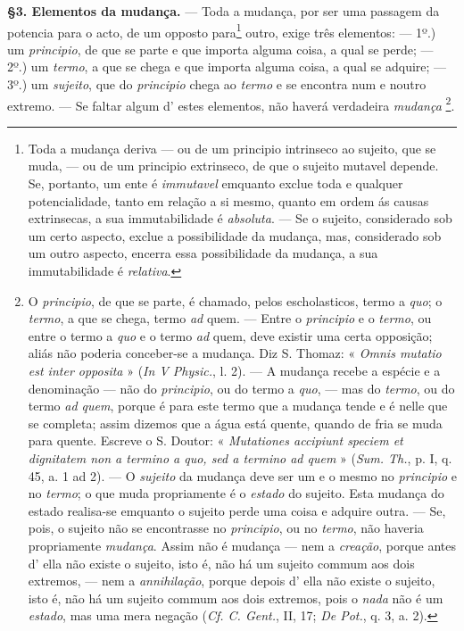 \textbf{§3. Elementos da mudança.} --- Toda a mudança, por ser uma passagem da potencia para o acto, de um opposto para\footnote{Toda a mudança deriva --- ou de um principio intrinseco ao sujeito, que se muda, --- ou de um principio extrinseco, de que o sujeito mutavel depende. Se, portanto, um ente é \emph{immutavel} emquanto exclue toda e qualquer potencialidade, tanto em relação a si mesmo, quanto em ordem ás causas extrinsecas, a sua immutabilidade é \emph{absoluta}. --- Se o sujeito, considerado sob um certo aspecto, exclue a possibilidade da mudança, mas, considerado sob um outro aspecto, encerra essa possibilidade da mudança, a sua immutabilidade é \emph{relativa}.} outro, exige três elementos: --- 1º.) um \emph{principio}, de que se parte e que importa alguma coisa, a qual se perde; --- 2º.) um \emph{termo}, a que se chega e que importa alguma coisa, a qual se adquire; --- 3º.) um \emph{sujeito}, que do \emph{principio} chega ao \emph{termo} e se encontra num e noutro extremo. --- Se faltar algum d' estes elementos, não haverá verdadeira \emph{mudança} \footnote{O \emph{principio}, de que se parte, é chamado, pelos escholasticos, termo a \emph{quo}; o \emph{termo}, a que se chega, termo \emph{ad} quem. --- Entre o \emph{principio} e o \emph{termo}, ou entre o termo a \emph{quo} e o termo \emph{ad} quem, deve existir uma certa opposição; aliás não poderia conceber-se a mudança. Diz S. Thomaz: « \emph{Omnis mutatio est inter opposita} » (\emph{In V Physic.}, l. 2). --- A mudança recebe a espécie e a denominação --- não do \emph{principio}, ou do termo a \emph{quo}, --- mas do \emph{termo}, ou do termo \emph{ad quem}, porque é para este termo que a mudança tende e é nelle que se completa; assim dizemos que a água está quente, quando de fria se muda para quente. Escreve o S. Doutor: « \emph{Mutationes accipiunt speciem et dignitatem non a termino a quo, sed a termino ad quem} » (\emph{Sum. Th.}, p. I, q. 45, a. 1 ad 2). --- O \emph{sujeito} da mudança deve ser um e o mesmo no \emph{principio} e no \emph{termo}; o que muda propriamente é o \emph{estado} do sujeito. Esta mudança do estado realisa-se emquanto o sujeito perde uma coisa e adquire outra. --- Se, pois, o sujeito não se encontrasse no \emph{principio}, ou no \emph{termo}, não haveria propriamente \emph{mudança}. Assim não é mudança --- nem a \emph{creação}, porque antes d' ella não existe o sujeito, isto é, não há um sujeito commum aos dois extremos, --- nem a \emph{annihilação}, porque depois d' ella não existe o sujeito, isto é, não há um sujeito commum aos dois extremos, pois o \emph{nada} não é um \emph{estado}, mas uma mera negação (\emph{Cf. C. Gent.}, II, 17; \emph{De Pot.}, q. 3, a. 2).}.

